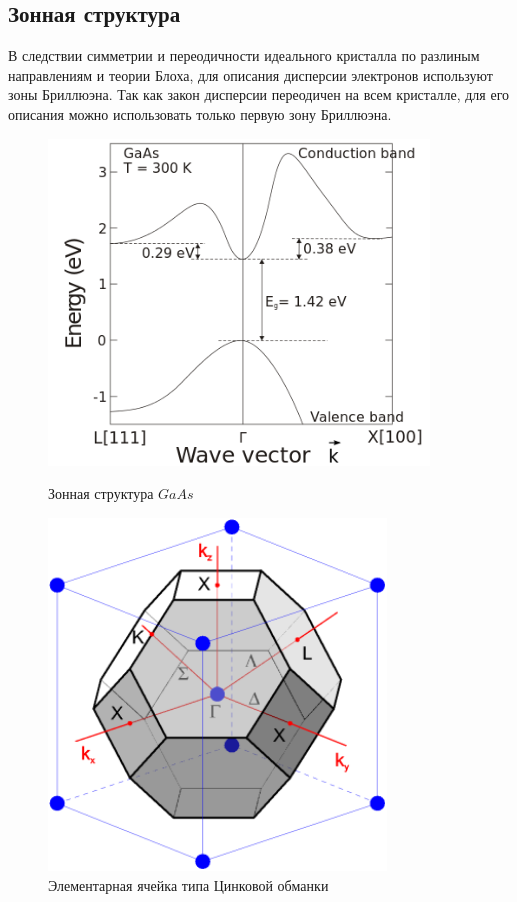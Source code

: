 \subsection{Зонная структура}
В следствии симметрии и переодичности идеального кристалла по разлиным направлениям и теории Блоха, для описания дисперсии электронов используют зоны Бриллюэна. Так как закон дисперсии переодичен на всем кристалле, для его описания можно использовать только первую зону Бриллюэна. 
\begin{figure}[h]
    \begin{minipage}[b]{0.5\textwidth}
		\centering
	    \includegraphics[width=0.9\textwidth]{assets/GaAs_E}
	    \caption{Зонная структура $GaAs$}
	\end{minipage}
	\hfill
	\begin{minipage}[b]{0.45\textwidth}
		\centering
		\includegraphics[width=0.8\textwidth]{assets/ZnLaer}
	    \caption{Элементарная ячейка типа Цинковой обманки}
	\end{minipage}
\end{figure}

